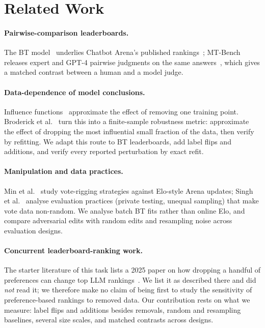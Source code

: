 \documentclass{article}
\begin{document}
\section{Related Work}
\label{sec:related}
\paragraph{Pairwise-comparison leaderboards.} The BT model~\cite{bradley1952rank} underlies Chatbot Arena's published rankings~\cite{chiang2024chatbot}; MT-Bench releases expert and GPT-4 pairwise judgments on the same answers~\cite{zheng2023judging}, which gives a matched contrast between a human and a model judge.

\paragraph{Data-dependence of model conclusions.} Influence functions~\cite{koh2017understanding} approximate the effect of removing one training point. Broderick et al.~\cite{broderick2020automatic} turn this into a finite-sample robustness metric: approximate the effect of dropping the most influential small fraction of the data, then verify by refitting. We adapt this route to BT leaderboards, add label flips and additions, and verify every reported perturbation by exact refit.

\paragraph{Manipulation and data practices.} Min et al.~\cite{min2025rigging} study vote-rigging strategies against Elo-style Arena updates; Singh et al.~\cite{singh2025illusion} analyse evaluation practices (private testing, unequal sampling) that make vote data non-random. We analyse batch BT fits rather than online Elo, and compare adversarial edits with random edits and resampling noise across evaluation designs.

\paragraph{Concurrent leaderboard-ranking work.} The starter literature of this task lists a 2025 paper on how dropping a handful of preferences can change top LLM rankings~\cite{huang2025dropping}. We list it as described there and did \emph{not} read it; we therefore make no claim of being first to study the sensitivity of preference-based rankings to removed data. Our contribution rests on what we measure: label flips and additions besides removals, random and resampling baselines, several size scales, and matched contrasts across designs.
\end{document}
